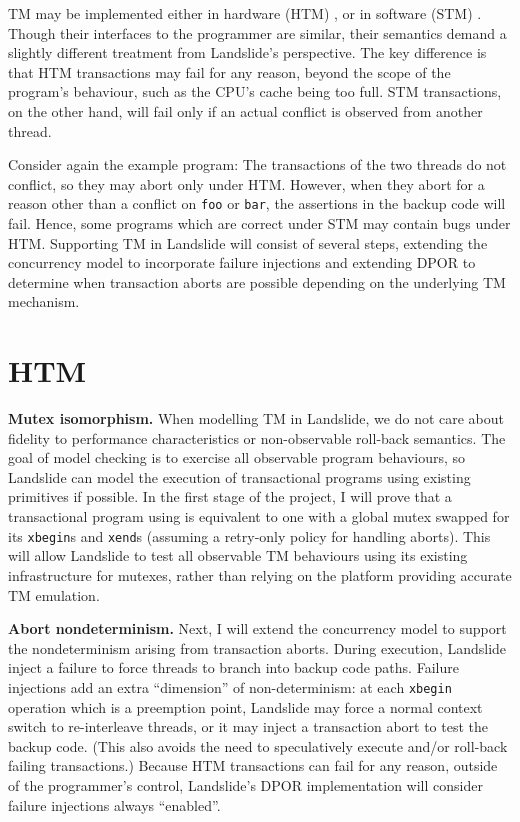 TM may be implemented either in hardware (HTM) \cite{htm-haswell}, or in software (STM) \cite{stm-pldi06}.
Though their interfaces to the programmer are similar, their semantics demand a slightly different treatment from Landslide's perspective.
The key difference is that HTM transactions may fail for any reason, beyond the scope of the program's behaviour, such as the CPU's cache being too full.
STM transactions, on the other hand, will fail only if an actual conflict is observed from another thread.

Consider again the example program: The transactions of the two threads do not conflict, so they may abort only under HTM.
However, when they abort for a reason other than a conflict on {\tt foo} or {\tt bar}, the assertions in the backup code will fail.
Hence, some programs which are correct under STM may contain bugs under HTM.
Supporting TM in Landslide will consist of several steps, extending the concurrency model to incorporate failure injections and extending DPOR to determine when transaction aborts are possible depending on the underlying TM mechanism.

\section{HTM}

{\bf Mutex isomorphism.}
When modelling TM in Landslide, we do not care about fidelity to performance characteristics or non-observable roll-back semantics.
The goal of model checking is to exercise all observable program behaviours,
so Landslide can model the execution of transactional programs using existing primitives if possible.
In the first stage of the project, I will prove that a transactional program using is equivalent to one with a global mutex swapped for its {\tt xbegin}s and {\tt xend}s (assuming a retry-only policy for handling aborts).
This will allow Landslide to test all observable TM behaviours using its existing infrastructure for mutexes,
rather than relying on the platform providing accurate TM emulation.

{\bf Abort nondeterminism.}
Next, I will extend the concurrency model to support the nondeterminism arising from transaction aborts.
During execution, Landslide inject a failure to force threads to branch into backup code paths.
Failure injections add an extra ``dimension'' of non-determinism:
at each {\tt xbegin} operation which is a preemption point, Landslide may force a normal context switch to re-interleave threads, or it may inject a transaction abort to test the backup code.
(This also avoids the need to speculatively execute and/or roll-back failing transactions.)
Because HTM transactions can fail for any reason, outside of the programmer's control, Landslide's DPOR implementation will consider failure injections always ``enabled''.

